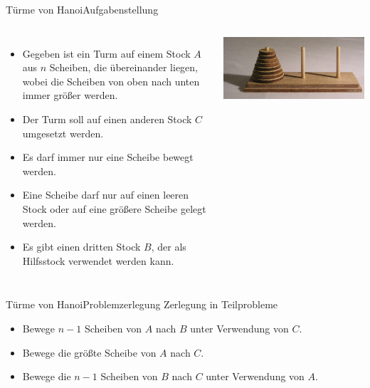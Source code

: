 \documentclass[xelatex,aspectratio=169]{beamer}
\begin{document}
\begin{frame}{Türme von Hanoi}{Aufgabenstellung}
  \vspace{-.5\baselineskip}
  \begin{columns}[onlytextwidth]
    \begin{itemize}
      \item Gegeben ist ein Turm auf einem Stock $A$ aus $n$ Scheiben, die übereinander liegen, wobei die Scheiben von oben nach unten immer größer werden.
      \item Der Turm soll auf einen anderen Stock $C$ umgesetzt werden.
      \item Es darf immer nur eine Scheibe bewegt werden.
      \item Eine Scheibe darf nur auf einen leeren Stock oder auf eine größere Scheibe gelegt werden.
      \item Es gibt einen dritten Stock $B$, der als Hilfsstock verwendet werden kann.
    \end{itemize}
    \begin{center}
      \includegraphics[width=\textwidth]{img/algorithmus_tower_of_hanoi.jpg}
    \end{center}

  \end{columns}
\end{frame}

\begin{frame}{Türme von Hanoi}{Problemzerlegung}
  Zerlegung in Teilprobleme
  \begin{itemize}
    \item Bewege $n-1$ Scheiben von $A$ nach $B$ unter Verwendung von $C$.
    \item Bewege die größte Scheibe von $A$ nach $C$.
    \item Bewege die $n-1$ Scheiben von $B$ nach $C$ unter Verwendung von $A$.
  \end{itemize}

\end{frame}
\end{document}
